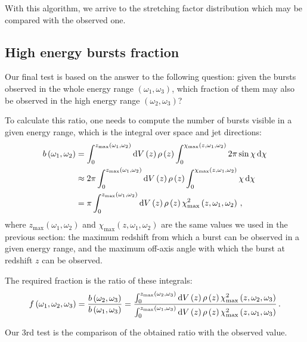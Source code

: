 \documentclass[manuscript]{aastex}
\begin{document}
With this algorithm, we arrive to the stretching factor distribution
which may be compared with the observed one. 

\subsection{High energy bursts fraction}

Our final test is based on the answer to the following question: given
the bursts observed in the whole energy range
$\left(\omega_1,\omega_3\right)$, which fraction of them may also be
observed in the high energy range $\left(\omega_2,\omega_3\right)$?

To calculate this ratio, one needs to compute the number of bursts
visible in a given energy range, which is the integral over space and
jet directions:
\begin{align}
b\left(\omega_1,\omega_2\right) &= \int_0^{z_\text{max}\left(\omega_1,\omega_2\right)} \dif V\left(z\right) \rho\left(z\right) \int_0^{\chi_\text{max}\left(z,\omega_1,\omega_2\right)} 2\pi \sin\chi \dif\chi \nonumber\\
&\approx 2\pi \int_0^{z_\text{max}\left(\omega_1,\omega_2\right)} \dif V\left(z\right) \rho\left(z\right) \int_0^{\chi_\text{max}\left(z,\omega_1,\omega_2\right)} \chi \dif\chi \nonumber\\
&= \pi \int_0^{z_\text{max}\left(\omega_1,\omega_2\right)} \dif V\left(z\right) \rho\left(z\right) \chi^2_\text{max}\left(z,\omega_1,\omega_2\right)\,,
\end{align}
where $z_\text{max}\left(\omega_1,\omega_2\right)$ and
$\chi_\text{max}\left(z,\omega_1,\omega_2\right)$ are the same values
we used in the previous section: the maximum redshift from which a
burst can be observed in a given energy range, and the maximum
off-axis angle with which the burst at redshift $z$ can be observed.

The required fraction is the ratio of these integrals:
\begin{equation}
f\left(\omega_1,\omega_2,\omega_3\right) = \frac{b\left(\omega_2,\omega_3\right)}{b\left(\omega_1,\omega_3\right)} = \frac{\int_0^{z_\text{max}\left(\omega_2,\omega_3\right)} \dif V\left(z\right) \rho\left(z\right) \chi^2_\text{max}\left(z,\omega_2,\omega_3\right)}{\int_0^{z_\text{max}\left(\omega_1,\omega_3\right)} \dif V\left(z\right) \rho\left(z\right) \chi^2_\text{max}\left(z,\omega_1,\omega_3\right)}\,.
\end{equation}

Our 3rd test is the comparison of the obtained ratio with the observed value.
\end{document}
